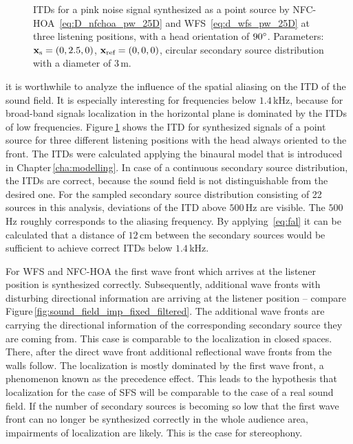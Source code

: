 %
\begin{figure}[tb]
    \small
    
    \caption{\acp{ITD} for a pink noise signal synthesized as a point source by
    \ac{NFC-HOA}~\protect\eqref{eq:D_nfchoa_pw_25D} and
    \ac{WFS}~\protect\eqref{eq:d_wfs_pw_25D} at three listening
    positions, with a head orientation of $90^\circ$.
    Parameters: $\mathbf{x}_\text{s} =(0,2.5,0)$, $\mathbf{x}_\text{ref} = (0,0,0)$, circular secondary source
    distribution with a diameter of $3$\,m.
    }
    \label{fig:sfs_itd}
\end{figure}
%
 it is worthwhile to analyze the influence of the
spatial aliasing on the \ac{ITD} of the sound field. It is especially
interesting for frequencies below $1.4$\,kHz, because for broad-band signals
localization in the horizontal plane
is dominated by the \acp{ITD} of low
frequencies.
Figure\,\ref{fig:sfs_itd} shows the \ac{ITD} for synthesized signals of a
point source for three different listening positions with the head always
oriented to the front. The \acp{ITD} were
calculated applying the binaural model that is introduced in
Chapter\,\ref{cha:modelling}.
In case of a continuous secondary source distribution, the \acp{ITD} are correct, because
the sound field is not distinguishable from the desired one. For the sampled
secondary source distribution consisting of 22 sources in this analysis, deviations of the
\ac{ITD} above $500$\,Hz are visible. The $500$\,Hz roughly corresponds to
the aliasing frequency. By applying~\eqref{eq:fal} it can be calculated that a
distance of $12$\,cm between the secondary sources would be sufficient to
achieve correct \acp{ITD} below $1.4$\,kHz.

For \ac{WFS} and \ac{NFC-HOA} the first wave front which arrives at
the listener position is synthesized correctly. Subsequently, additional
wave fronts with disturbing directional information are arriving at the listener
position -- compare Figure\,\ref{fig:sound_field_imp_fixed_filtered}. The
additional wave fronts are carrying the directional information of the corresponding
secondary source they are coming from. This
case is comparable to the localization in closed spaces. There, after the
direct wave front additional reflectional wave fronts from the walls follow.
The localization is mostly dominated by the first wave front, a
phenomenon known as the precedence effect.\autocite[][]{Litovsky1999}
This leads to the hypothesis that localization for the case of \ac{SFS}
will be comparable to the case of a real sound field.
If the number of secondary sources is becoming so low that the first
wave front can no longer be synthesized correctly in the whole audience area,
impairments of localization are likely. This is the case for stereophony.

